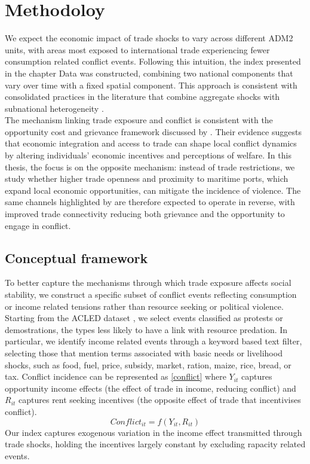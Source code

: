 \chapter{Methodoloy}

We expect the economic impact of trade shocks to vary across different ADM2 units, with areas most exposed to international trade experiencing fewer consumption related conflict events. Following this intuition, the index presented in the chapter Data was constructed, combining two national components that vary over time with a fixed spatial component. This approach is consistent with consolidated practices in the literature that combine aggregate shocks with subnational heterogeneity \parencite{autor2013china}.\\

The mechanism linking trade exposure and conflict is consistent with the opportunity cost and grievance framework discussed by \textcite{amodio2021security}. Their evidence suggests that economic integration and access to trade can shape local conflict dynamics by altering individuals’ economic incentives and perceptions of welfare.
In this thesis, the focus is on the opposite mechanism: instead of trade restrictions, we study whether higher trade openness and proximity to maritime ports, which expand local economic opportunities, can mitigate the incidence of violence. The same channels highlighted by \textcite{amodio2021security} are therefore expected to operate in reverse, with improved trade connectivity reducing both grievance and the opportunity to engage in conflict.

\section{Conceptual framework}
To better capture the mechanisms through which trade exposure affects social stability, we construct a specific subset of conflict events reflecting consumption or income related tensions rather than resource seeking or political violence. Starting from the ACLED dataset \parencite{acled2025}, we select events classified as protests or demostrations, the types less likely to have a link with resource predation. In particular, we identify income related events through a keyword based text filter, selecting those that mention terms associated with basic needs or livelihood shocks, such as food, fuel, price, subsidy, market, ration, maize, rice, bread, or tax.
Conflict incidence can be represented as \eqref{conflict} where $Y_{it}$ captures opportunity income effects (the effect of trade in income, reducing conflict) and $R_{it}$ captures rent seeking incentives (the opposite effect of trade that incentivises conflict).
\begin{equation}
	Conflict_{it} = f(Y_{it}, R_{it})
	\label{conflict}
\end{equation}
Our index captures exogenous variation in the income effect transmitted through trade shocks, holding the incentives largely constant by excluding rapacity related events.

